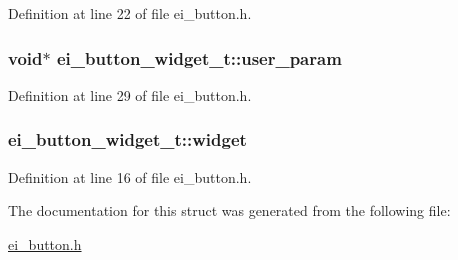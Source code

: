 Definition at line 22 of file ei\_\-button.h.\hypertarget{structei__button__widget__t_a22fbd9b5b8759b559ac50b85e64c6e4f}{
\subsubsection[{user\_\-param}]{\setlength{\rightskip}{0pt plus 5cm}void$\ast$ {\bf ei\_\-button\_\-widget\_\-t::user\_\-param}}}
\label{structei__button__widget__t_a22fbd9b5b8759b559ac50b85e64c6e4f}


Definition at line 29 of file ei\_\-button.h.\hypertarget{structei__button__widget__t_afe19016fcaae2769f18f3b1d73c5579d}{
\subsubsection[{widget}]{ {\bf ei\_\-button\_\-widget\_\-t::widget}}}
\label{structei__button__widget__t_afe19016fcaae2769f18f3b1d73c5579d}


Definition at line 16 of file ei\_\-button.h.

The documentation for this struct was generated from the following file:\begin{DoxyCompactItemize}
\item 
\hyperlink{ei__button_8h}{ei\_\-button.h}\end{DoxyCompactItemize}
